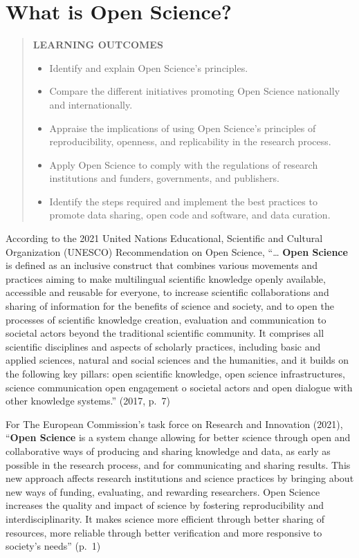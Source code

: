 \documentclass[
]{book}
\providecommand{\tightlist}{%
  \setlength{\itemsep}{0pt}\setlength{\parskip}{0pt}}
\theoremstyle{definition}
\theoremstyle{definition}
\theoremstyle{definition}
\theoremstyle{definition}
\theoremstyle{remark}
\begin{document}
\hypertarget{what-is-open-science}{%
\chapter{What is Open Science?}\label{what-is-open-science}}

\begin{quote}
\textbf{LEARNING OUTCOMES}

\begin{itemize}
\tightlist
\item
  Identify and explain Open Science's principles.
\item
  Compare the different initiatives promoting Open Science nationally and internationally.
\item
  Appraise the implications of using Open Science's principles of reproducibility, openness, and replicability in the research process.
\item
  Apply Open Science to comply with the regulations of research institutions and funders, governments, and publishers.
\item
  Identify the steps required and implement the best practices to promote data sharing, open code and software, and data curation.
\end{itemize}
\end{quote}

According to the 2021 United Nations Educational, Scientific and Cultural Organization (UNESCO) Recommendation on Open Science, ``\ldots{} \textbf{Open Science} is defined as an inclusive construct that combines various movements and practices aiming to make multilingual scientific knowledge openly available, accessible and reusable for everyone, to increase scientific collaborations and sharing of information for the benefits of science and society, and to open the processes of scientific knowledge creation, evaluation and communication to societal actors beyond the traditional scientific community. It comprises all scientific disciplines and aspects of scholarly practices, including basic and applied sciences, natural and social sciences and the humanities, and it builds on the following key pillars: open scientific knowledge, open science infrastructures, science communication open engagement o societal actors and open dialogue with other knowledge systems.'' (2017, p.~7)

For The European Commission's task force on Research and Innovation (2021), ``\textbf{Open Science} is a system change allowing for better science through open and collaborative ways of producing and sharing knowledge and data, as early as possible in the research process, and for communicating and sharing results. This new approach affects research institutions and science practices by bringing about new ways of funding, evaluating, and rewarding researchers. Open Science increases the quality and impact of science by fostering reproducibility and interdisciplinarity. It makes science more efficient through better sharing of resources, more reliable through better verification and more responsive to society's needs'' (p.~1)
\end{document}
